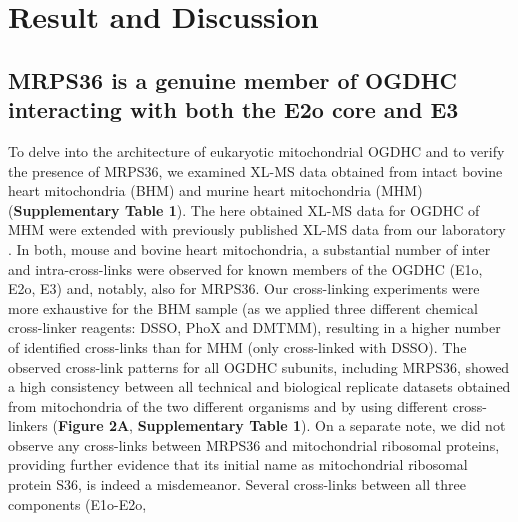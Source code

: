 \documentclass[times, twoside]{zHenriquesLab-StyleBioRxiv}
\begin{document}
\section*{Result and Discussion}
\subsection*{MRPS36 is a genuine member of OGDHC interacting with both the E2o core and E3}
To delve into the architecture of eukaryotic mitochondrial OGDHC and to verify the presence of MRPS36, we examined XL-MS data obtained from intact bovine heart mitochondria (BHM) \cite{Hevler_2021b} and murine heart mitochondria (MHM) (\textbf{Supplementary Table 1}). The here obtained XL-MS data for OGDHC of MHM were extended with previously published XL-MS data from our laboratory \cite{Liu_2018}. In both, mouse and bovine heart mitochondria, a substantial number of inter and intra-cross-links were observed for known members of the OGDHC (E1o, E2o, E3) and, notably, also for MRPS36. Our cross-linking experiments were more exhaustive for the BHM sample (as we applied three different chemical cross-linker reagents: DSSO, PhoX and DMTMM), resulting in a higher number of identified cross-links than for MHM (only cross-linked with DSSO). The observed cross-link patterns for all OGDHC subunits, including MRPS36, showed a high consistency between all technical and biological replicate datasets obtained from mitochondria of the two different organisms and by using different cross-linkers (\textbf{Figure 2A}, \textbf{Supplementary Table 1}). On a separate note, we did not observe any cross-links between MRPS36 and mitochondrial ribosomal proteins, providing further evidence that its initial name as mitochondrial ribosomal protein S36, is indeed a misdemeanor. Several cross-links between all three components (E1o-E2o,
\end{document}
